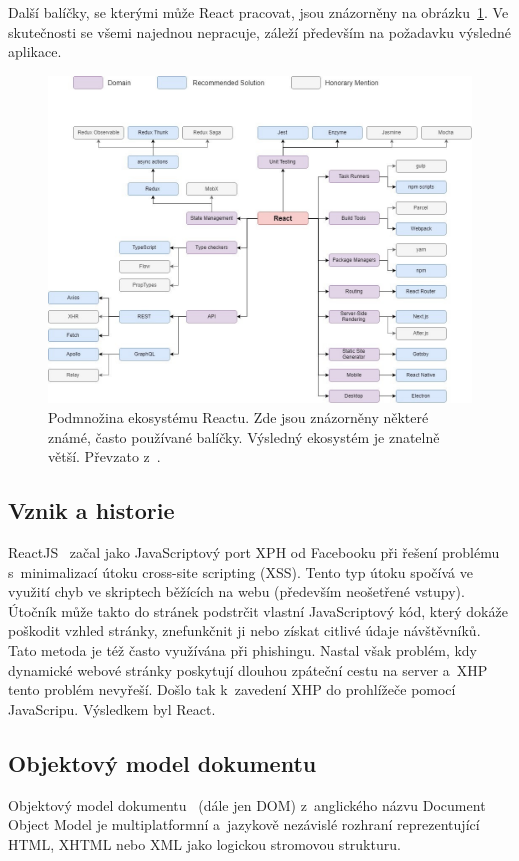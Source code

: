 Další balíčky, se kterými může React pracovat, jsou znázorněny na obrázku~\ref{obr:Ekosystém Reactu}. Ve skutečnosti se všemi najednou nepracuje, záleží především na požadavku výsledné aplikace.
\begin{figure}[hbt]
	\centering
	\setlength{\fboxsep}{0pt}
	\includegraphics[width=1\textwidth]{obrazky-figures/ReactEcosystem.png}
	\caption{Podmnožina ekosystému Reactu. Zde jsou znázorněny některé známé, často používané balíčky. Výsledný ekosystém je znatelně větší. Převzato z~\cite{website:EverythingReact}.}
	\label{obr:Ekosystém Reactu}
\end{figure}

\subsection*{Vznik a historie}
ReactJS~\cite{website:ReactHistory} začal jako JavaScriptový port XPH od Facebooku při řešení problému s~minimalizací útoku cross-site scripting (XSS). Tento typ útoku spočívá ve využití chyb ve skriptech běžících na webu (především neošetřené vstupy). Útočník může takto do stránek podstrčit vlastní JavaScriptový kód, který dokáže poškodit vzhled stránky, znefunkčnit ji nebo získat citlivé údaje návštěvníků. Tato metoda je též často využívána při phishingu. Nastal však problém, kdy dynamické webové stránky poskytují dlouhou zpáteční cestu na server a~XHP tento problém nevyřeší. Došlo tak k~zavedení XHP do prohlížeče pomocí JavaScripu. Výsledkem byl React.

\subsection*{Objektový model dokumentu}
Objektový model dokumentu~\cite{article:BeginnersGuideToReact} (dále jen DOM) z~anglického názvu Document Object Model je multiplatformní a~jazykově nezávislé rozhraní reprezentující HTML, XHTML nebo XML jako logickou stromovou strukturu.

